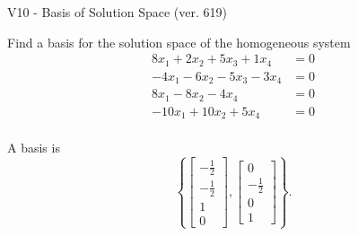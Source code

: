 \begin{exercise}
  \begin{exerciseTitle}V10 - Basis of Solution Space (ver. 619)\end{exerciseTitle}
  \begin{exerciseStatement}
    Find a basis for the solution space of the homogeneous system 
\begin{align*}
 8 x_ 1 + 2 x_ 2 + 5 x_ 3 + 1 x_ 4 &= 0  \\ 
  -4 x_ 1 -6 x_ 2 -5 x_ 3 -3 x_ 4 &= 0  \\ 
  8 x_ 1 -8 x_ 2 -4 x_ 4 &= 0  \\ 
  -10 x_ 1 + 10 x_ 2 + 5 x_ 4 &= 0  \\ 
 \end{align*}


 
  \end{exerciseStatement}

  \begin{exerciseAnswer}
   A basis is   
\[\left\{\left[\begin{array}{c}
-\frac{1}{2} \\
-\frac{1}{2} \\
1 \\
0
\end{array}\right] , \left[\begin{array}{c}
0 \\
-\frac{1}{2} \\
0 \\
1
\end{array}\right]\right\}.\]

  


  \end{exerciseAnswer}
\end{exercise}